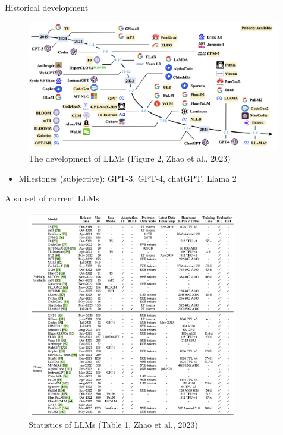 \documentclass[10pt]{beamer}
\begin{document}
\begin{frame}{Historical development}

\begin{figure}[h]
\centering
\includegraphics[width=0.99\textwidth]{fig/fig2_zhao_2023}
\caption{The development of LLMs (Figure 2, Zhao et al., 2023)}
\end{figure}

\begin{itemize}
    \item Milestones (subjective): GPT-3, GPT-4, chatGPT, Llama 2
\end{itemize}

\end{frame}

\begin{frame}{A subset of current LLMs}

\begin{figure}[h]
\centering
\includegraphics[width=0.82\textwidth]{fig/tab1_zhao_2023}
\caption{Statistics of LLMs (Table 1, Zhao et al., 2023)}
\end{figure}

\end{frame}
\end{document}
